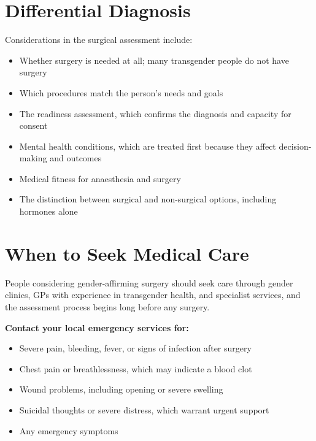 \section*{Differential Diagnosis}
Considerations in the surgical assessment include:
\begin{itemize}
    \item Whether surgery is needed at all; many transgender people do not have surgery
    \item Which procedures match the person's needs and goals
    \item The readiness assessment, which confirms the diagnosis and capacity for consent
    \item Mental health conditions, which are treated first because they affect decision-making and outcomes
    \item Medical fitness for anaesthesia and surgery
    \item The distinction between surgical and non-surgical options, including hormones alone
\end{itemize}

\section*{When to Seek Medical Care}
People considering gender-affirming surgery should seek care through gender clinics, GPs with experience in transgender health, and specialist services, and the assessment process begins long before any surgery.

\textbf{Contact your local emergency services for:}
\begin{itemize}
    \item Severe pain, bleeding, fever, or signs of infection after surgery
    \item Chest pain or breathlessness, which may indicate a blood clot
    \item Wound problems, including opening or severe swelling
    \item Suicidal thoughts or severe distress, which warrant urgent support
    \item Any emergency symptoms
\end{itemize}

